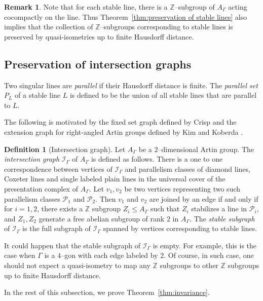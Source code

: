 \documentclass[11pt]{amsart}
\newcommand {\I}{\mathcal I}
\newcommand {\p}{\mathcal P}
\theoremstyle{definition}
\newtheorem{definition}[theorem]{Definition}
\newtheorem{remark}[theorem]{Remark}
\begin{document}
\begin{remark}
Note that for each stable line, there is a $\mathbb Z$--subgroup of $A_\Gamma$ acting cocompactly on the line. Thus Theorem~\ref{thm:preservation of stable lines} also implies that the collection of $\mathbb Z$--subgroups corresponding to stable lines is preserved by quasi-isometries up to finite Hausdorff distance.
\end{remark}

\subsection{Preservation of intersection graphs}
Two singular lines are \emph{parallel} if their Hausdorff distance is finite. The \emph{parallel set} $P_L$ of a stable line $L$ is defined to be the union of all stable lines that are parallel to $L$. 

The following is motivated by the fixed set graph defined by Crisp \cite{MR2174269} and the extension graph for right-angled Artin groups defined by Kim and Koberda \cite{kim2013embedability}. 

\begin{definition}[Intersection graph]
	\label{def:intersection graph}
	Let $A_\Gamma$ be a $2$--dimensional Artin group. The \emph{intersection graph} $\I_\Gamma$ of $A_\Gamma$ is defined as follows. There is a one to one correspondence between vertices of $\I_\Gamma$ and parallelism classes of diamond lines, Coxeter lines and single labeled plain lines in the universal cover of the presentation complex of $A_\Gamma$. Let $v_1,v_2$ be two vertices representing two such parallelism classes $\p_1$ and $\p_2$. Then $v_1$ and $v_2$ are joined by an edge if and only if for $i=1,2$, there exists a $\mathbb Z$ subgroup $Z_i\le A_\Gamma$ such that $Z_i$ stabilizes a line in $\p_i$, and $Z_1,Z_2$ generate a free abelian subgroup of rank $2$ in $A_\Gamma$. The \emph{stable subgraph} of $\I_\Gamma$ is the full subgraph of $\I_\Gamma$ spanned by vertices corresponding to stable lines. 
\end{definition}

It could happen that the stable subgraph of $\I_\Gamma$ is empty. For example, this is the case when $\Gamma$ is a $4$--gon with each edge labeled by $2$. Of course, in such case, one should not expect a quasi-isometry to map any $\mathbb Z$ subgroups to other $\mathbb Z$ subgroups up to finite Hausdorff distance.

In the rest of this subsection, we prove Theorem~\ref{thm:invariance}.
\end{document}
